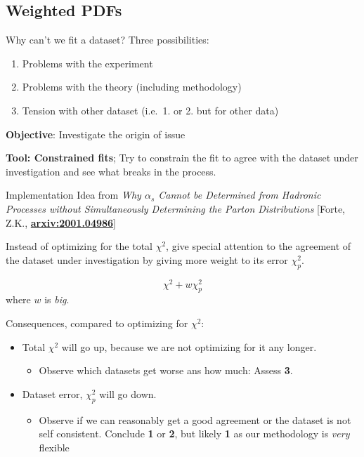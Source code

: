 \author[Zahari Kassabov]{}
\subsection{Weighted PDFs}
\begin{frame}{Why can't we fit a dataset?}
\protect\hypertarget{why-cant-we-fit-a-dataset}{}
Three possibilities:

\begin{enumerate}
\tightlist
\item
  Problems with the experiment
\item
  Problems with the theory (including methodology)
\item
  Tension with other dataset (i.e.~1. or 2. but for other data)
\end{enumerate}

\textbf{Objective}: Investigate the origin of issue

\textbf{Tool: Constrained fits}; Try to constrain the fit to agree with
the dataset under investigation and see what breaks in the process.
\end{frame}

\begin{frame}{Implementation}
\protect\hypertarget{implementation}{}
Idea from \emph{Why \(\alpha_s\) Cannot be Determined from Hadronic
Processes without Simultaneously Determining the Parton Distributions}
{[}Forte, Z.K.,
\href{https://arxiv.org/abs/2001.04986}{\textbf{arxiv:2001.04986}}{]}

Instead of optimizing for the total \(\chi^2\), give special attention
to the agreement of the dataset under investigation by giving more
weight to its error \(\chi^2_p\).

\[
\chi^2 + w \chi^2_p
\] where \(w\) is \emph{big}.

Consequences, compared to optimizing for \(\chi^2\):

\begin{itemize}
\tightlist
\item
  Total \(\chi^2\) will go up, because we are not optimizing for it any
  longer.

  \begin{itemize}
  \tightlist
  \item
    Observe which datasets get worse ans how much: Assess \textbf{3}.
  \end{itemize}
\item
  Dataset error, \(\chi^2_p\) will go down.

  \begin{itemize}
  \tightlist
  \item
    Observe if we can reasonably get a good agreement or the dataset is
    not self consistent. Conclude \textbf{1} or \textbf{2}, but likely
    \textbf{1} as our methodology is \emph{very} flexible
  \end{itemize}
\end{itemize}
\end{frame}

